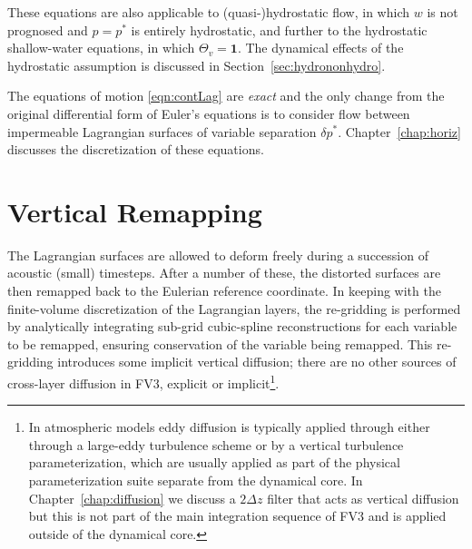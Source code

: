 \documentclass[10pt,letterpaper,margin=1in]{memoir}
\begin{document}
These equations are also applicable to (quasi-)hydrostatic flow, in which $w$ is not prognosed and $p=p^*$ is entirely hydrostatic, and further to the hydrostatic shallow-water equations, in which $\Theta_v = \mathbf{1}$. The dynamical effects of the hydrostatic assumption is discussed in Section~\ref{sec:hydrononhydro}.


The equations of motion \eqref{eqn:contLag} are \textit{exact} and the only change from the original differential form of Euler's equations is to consider flow between impermeable Lagrangian surfaces of variable separation $\delta p^*$. Chapter~\ref{chap:horiz} discusses the discretization of these equations.

\section{Vertical Remapping} \label{sec:verticalremapping}

The Lagrangian surfaces are allowed to deform freely during a succession of acoustic (small) timesteps. After a number of these, the distorted surfaces are then remapped back to the Eulerian reference coordinate. In keeping with the finite-volume discretization of the Lagrangian layers, the re-gridding is performed by analytically integrating sub-grid cubic-spline reconstructions for each variable to be remapped, ensuring conservation of the variable being remapped.
This re-gridding introduces some implicit vertical diffusion; there are no other sources of cross-layer diffusion in FV3, explicit or implicit\footnote{In atmospheric models eddy diffusion is typically applied through either through a large-eddy turbulence scheme or by a vertical turbulence parameterization, which are usually applied as part of the physical parameterization suite separate from the dynamical core. In Chapter~\ref{chap:diffusion} we discuss a $2\Delta z$ filter that acts as vertical diffusion but this is not part of the main integration sequence of FV3 and is applied outside of the dynamical core.}.
\end{document}

